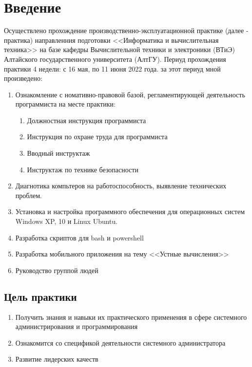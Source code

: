 \documentclass[a4paper, 12pt]{article}
\begin{document}
\section{Введение}
Осуществлено прохождение производственно-эксплуатационной практике (далее - практика) направленния подготовки <<Информатика и вычислительная техника>> на базе кафедры Вычислительной техники и электроники (ВТиЭ) Алтайского государственного университета (АлтГУ).  
Периуд прохождения практики 4 недели: с 16 мая, по 11 июня 2022 года. за этот периуд мной произведено:
\begin{enumerate}
  \item Ознакомление с номативно-правовой базой, регламентирующей деятельность программиста на месте практики:
  \begin{enumerate}
    \item Должностная инструкция программиста
    \item Инструкция по охране труда для программиста
    \item Вводный инструктаж
    \item Инструктаж по технике безопасности
  \end{enumerate}
  \item Диагнотика компьтеров на работоспособность, выявление технических проблем.
  \item Установка и настройка программного обеспечения для операционных систем Windows XP, 10 и Linux Ubuntu.
  \item Разработка скриптов для bash и powershell
  \item Разработка мобильного приложения на тему <<Устные вычисления>>
  \item Руководство группой людей
\end{enumerate} 

\subsection*{Цель практики}
\begin{enumerate}
  \item Получить знания и навыки их практического применения в сфере системного администрирования и программирования
  \item Ознакомится со спецификой деятельности системного администратора
  \item Развитие лидерских качеств
\end{enumerate}
\end{document}
